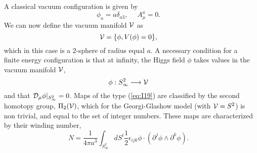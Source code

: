 A classical vacuum configuration is given by
\begin{equation}
\phi_{a}=a \delta_{a3}, \: \: \: \: \: \: A_{\mu}^{a}=0.
\label{eq:I17}
\end{equation}
We can now define the vacuum manifold ${\cal V}$ as 
\begin{equation}
{\cal V} = \{ \phi, V(\phi)=0 \},
\label{eq:I18}
\end{equation}
which in this case is a $2$-sphere of radius equal $a$. A necessary
condition for a finite energy configuration is that at infinity,
the Higgs field $\phi$ takes values in the vacuum manifold ${\cal
V}$,
\begin{equation}
\phi: S_{\infty}^2 \longrightarrow {\cal V}
\label{eq:I19}
\end{equation}
and that ${\cal D}_{\mu} \phi |_{S_{\infty}^2}=0$. Maps of
the type (\ref{eq:I19}) are classified by the second homotopy
group, $\Pi_2({\cal V})$, which for the Georgi-Glashow model
(with ${\cal V}=S^2$) is non trivial, and equal to the set of
integer numbers. These maps are characterized by their winding
number,
\begin{equation}
N= \frac {1}{4 \pi a^{3}} \int_{S_{\infty}^2} dS^{i} \frac {1}{2} \epsilon_{ijk}
\phi \cdot ( \partial^{j} \phi \wedge \partial^{k} \phi ).
\label{eq:I20}
\end{equation}
  
